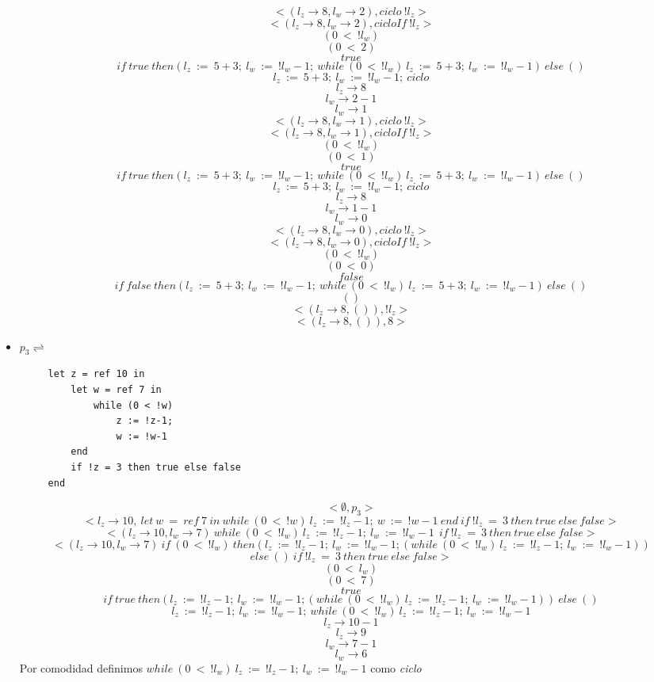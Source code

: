 \documentclass[11pt, a4paper]{report}
\begin{document}
\begin{itemize}
	$$<(l_{z}\rightarrow8, l_{w}\rightarrow2),ciclo\ !l_{z}>$$
	$$<(l_{z}\rightarrow8, l_{w}\rightarrow2),cicloIf\ !l_{z}>$$
	$$(0\ <\ !l_{w})$$
	$$(0\ <\ 2)$$
	$$ true $$
	$$if\ true\ then(l_{z}\ :=\ 5+3;\ l_{w}\ :=\ !l_{w}-1;\ while\ (0\ <\ !l_{w})\ l_{z}\ :=\ 5+3;\ l_{w}\ :=\ !l_{w}-1)\ else\ ()$$
	$$l_{z}\ :=\ 5+3;\ l_{w}\ :=\ !l_{w}-1;\ ciclo $$
	$$l_{z} \rightarrow 8$$
	$$l_{w} \rightarrow 2-1 $$
	$$l_{w} \rightarrow 1 $$
	$$<(l_{z}\rightarrow8, l_{w}\rightarrow1),ciclo\ !l_{z}>$$
	$$<(l_{z}\rightarrow8, l_{w}\rightarrow1),cicloIf\ !l_{z}>$$
	$$(0\ <\ !l_{w})$$
	$$(0\ <\ 1)$$
	$$ true $$
	$$if\ true\ then(l_{z}\ :=\ 5+3;\ l_{w}\ :=\ !l_{w}-1;\ while\ (0\ <\ !l_{w})\ l_{z}\ :=\ 5+3;\ l_{w}\ :=\ !l_{w}-1)\ else\ ()$$
	$$l_{z}\ :=\ 5+3;\ l_{w}\ :=\ !l_{w}-1;\ ciclo $$
	$$l_{z} \rightarrow 8$$
	$$l_{w} \rightarrow 1-1 $$
	$$l_{w} \rightarrow 0 $$
	$$<(l_{z}\rightarrow8, l_{w}\rightarrow0),ciclo\ !l_{z}>$$
	$$<(l_{z}\rightarrow8, l_{w}\rightarrow0),cicloIf\ !l_{z}>$$
	$$(0\ <\ !l_{w})$$
	$$(0\ <\ 0)$$
	$$ false $$
	$$if\ false\ then(l_{z}\ :=\ 5+3;\ l_{w}\ :=\ !l_{w}-1;\ while\ (0\ <\ !l_{w})\ l_{z}\ :=\ 5+3;\ l_{w}\ :=\ !l_{w}-1)\ else\ ()$$
	$$()$$
	$$<(l_{z}\rightarrow8,()),!l_{z}>$$
	$$<(l_{z}\rightarrow8,()),8>$$
	\item $p_{3} \rightleftharpoons$
		\begin{lstlisting}
	 let z = ref 10 in
	     let w = ref 7 in
	         while (0 < !w)
	             z := !z-1;
	             w := !w-1
	     end
	     if !z = 3 then true else false
	 end
		\end{lstlisting}
	$$<\emptyset,p_{3}>$$
	$$<l_{z}\rightarrow10,\ let\ w\ = \ ref\ 7\ in\ while\ (0\ <\ !w)\ l_{z}\ :=\ !l_{z}-1;\ w\ :=\ !w-1\ end\ if\ !l_{z}\ =\ 3\ then\ true\ else\ false>$$
	$$<(l_{z}\rightarrow10,l_{w}\rightarrow7)\ while\ (0\ <\ !l_{w})\ l_{z}\ :=\ !l_{z}-1;\ l_{w}\ :=\ !l_{w}-1\ \ if\ !l_{z}\ =\ 3\ then\ true\ else\ false>$$
	$$<(l_{z}\rightarrow10,l_{w}\rightarrow7)\ if\ (0\ <\ !l_{w})\ then(l_{z}\ :=\ !l_{z}-1;\ l_{w}\ :=\ !l_{w}-1;(while\ (0\ <\ !l_{w})\ l_{z}\ :=\ !l_{z}-1;\ l_{w}\ :=\ !l_{w}-1))$$
	$$ else\ ()\ if\ !l_{z}\ =\ 3\ then\ true\ else\ false>$$
	$$(0\ <\ l_{w})$$
	$$(0\ <\ 7)$$
	$$true$$
	$$if\ true\ then(l_{z}\ :=\ !l_{z}-1;\ l_{w}\ :=\ !l_{w}-1;(while\ (0\ <\ !l_{w})\ l_{z}\ :=\ !l_{z}-1;\ l_{w}\ :=\ !l_{w}-1))\ else\ ()$$
	$$l_{z}\ :=\ !l_{z}-1;\ l_{w}\ :=\ !l_{w}-1;\ while\ (0\ <\ !l_{w})\ l_{z}\ :=\ !l_{z}-1;\ l_{w}\ :=\ !l_{w}-1$$
	$$l_{z} \rightarrow 10-1$$
	$$l_{z} \rightarrow 9$$
	$$l_{w} \rightarrow 7-1$$
	$$l_{w} \rightarrow 6$$
	Por comodidad definimos $while\ (0\ <\ !l_{w})\ l_{z}\ :=\ !l_{z}-1;\ l_{w}\ :=\ !l_{w}-1$ como \textit{ciclo}\\

\end{itemize}
\end{document}
